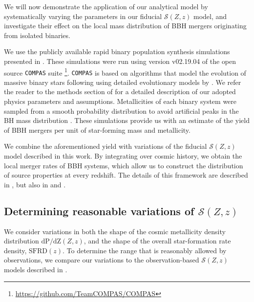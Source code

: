 \documentclass[twocolumn]{aastex631}
\newcommand{\SFRDzZ}{\ensuremath{\mathcal{S}(Z,z)}\xspace}
\newcommand{\SFRDz}{\ensuremath{\mathrm{SFRD}(z)}\xspace}
\newcommand{\dpdZ}{\ensuremath{\mathrm{dP/dZ}(Z,z)}\xspace}
\newcommand{\COMPAS}{{\tt COMPAS}\xspace}
\begin{document}
We will now demonstrate the application of our analytical model by systematically varying the parameters in our fiducial \SFRDzZ model, and investigate their effect on the local mass distribution of BBH mergers originating from isolated binaries. 


We use the publicly available rapid binary population synthesis simulations presented in \cite{vanson+2022}. 
These simulations were run using version v02.19.04 of the open source \COMPAS suite \citep{COMPAS_method}\footnote{\url{https://github.com/TeamCOMPAS/COMPAS}}. \COMPAS is based on algorithms that model the evolution of massive binary stars following \citet{Hurley+2000, Hurley+2002} using detailed evolutionary models by \citet{Pols+1998}.  We refer the reader to the methods section of \cite{vanson+2022} for a detailed description of our adopted physics parameters and assumptions.
%
Metallicities of each binary system were sampled from a smooth probability distribution to avoid artificial peaks in the BH mass distribution \citep[e.g.][]{Dominik2015,Kummer_thesis}. 
These simulations provide us with an estimate of the yield of BBH mergers per unit of star-forming mass and metallicity. 

We combine the aforementioned yield with variations of the fiducial \SFRDzZ model described in this work. By integrating over cosmic history, we obtain the local merger rates of BBH systems, which allow us to construct the distribution of source properties at every redshift. The details of this framework are described in \cite{vanson+2022}, but also in \cite{Broekgaarden+2021a} and \cite{Neijssel+2019}. 


\subsection{Determining reasonable variations of \SFRDzZ \label{ss: reasonable var}}
We consider variations in both the shape of the cosmic metallicity density distribution \dpdZ, and the shape of the overall star-formation rate density, \SFRDz. To determine the range that is reasonably allowed by observations, we compare our variations to the observation-based \SFRDzZ models described in \cite{Chruslinska+2021}.
\end{document}
